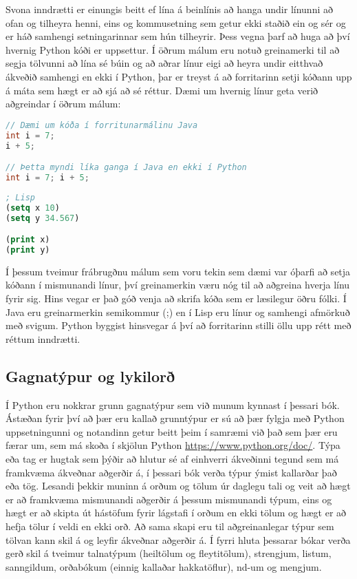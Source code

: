 Svona inndrætti er einungis beitt ef lína á beinlínis að hanga undir línunni að ofan og tilheyra henni, eins og kommusetning sem getur ekki staðið ein og sér og er háð samhengi setningarinnar sem hún tilheyrir.
Þess vegna þarf að huga að því hvernig Python kóði er uppsettur. 
Í öðrum málum eru notuð greinamerki til að segja tölvunni að lína sé búin og að aðrar línur eigi að heyra undir eitthvað ákveðið samhengi en ekki í Python, þar er treyst á að forritarinn setji kóðann upp á máta sem hægt er að sjá að sé réttur. 
Dæmi um hvernig línur geta verið aðgreindar í öðrum málum:

\begin{lstlisting}[language=Java , caption=Dæmi um annað mál sem er strangt tagað og með greinamerkjum]
// Dæmi um kóða í forritunarmálinu Java
int i = 7;
i + 5;

// Þetta myndi líka ganga í Java en ekki í Python
int i = 7; i + 5;
\end{lstlisting}

\begin{lstlisting}[language=Lisp, caption=Dæmi um annað mál sem byggir á afmörkuðu samhengi en með greinamerkjum]
; Lisp
(setq x 10)
(setq y 34.567)

(print x)
(print y)
\end{lstlisting}

Í þessum tveimur frábrugðnu málum sem voru tekin sem dæmi var óþarfi að setja kóðann í mismunandi línur, því greinamerkin væru nóg til að aðgreina hverja línu fyrir sig. 
Hins vegar er það góð venja að skrifa kóða sem er læsilegur öðru fólki. Í Java eru greinarmerkin semikommur (;) en í Lisp eru línur og samhengi afmörkuð með svigum. 
Python byggist hinsvegar á því að forritarinn stilli öllu upp rétt með réttum inndrætti. 

\subsection{Gagnatýpur og lykilorð}

Í Python eru nokkrar grunn gagnatýpur sem við munum kynnast í þessari bók. 
Ástæðan fyrir því að þær eru kallað grunntýpur er sú að þær fylgja með Python uppsetningunni og notandinn getur beitt þeim í samræmi við það sem þær eru færar um, sem má skoða í skjölun Python \href{https://www.python.org/doc/}{https://www.python.org/doc/}. 
Týpa eða tag er hugtak sem þýðir að hlutur sé af einhverri ákveðinni tegund sem má framkvæma ákveðnar aðgerðir á, í þessari bók verða týpur ýmist kallarðar það eða tög. 
Lesandi þekkir muninn á orðum og tölum úr daglegu tali og veit að hægt er að framkvæma mismunandi aðgerðir á þessum mismunandi týpum, eins og hægt er að skipta út hástöfum fyrir lágstafi í orðum en ekki tölum og hægt er að hefja tölur í veldi en ekki orð. 
Að sama skapi eru til aðgreinanlegar týpur sem tölvan kann skil á og leyfir ákveðnar aðgerðir á.
Í fyrri hluta þessarar bókar verða gerð skil á tveimur talnatýpum (heiltölum og fleytitölum), strengjum, listum, sanngildum, orðabókum (einnig kallaðar hakkatöflur), nd-um og mengjum.

